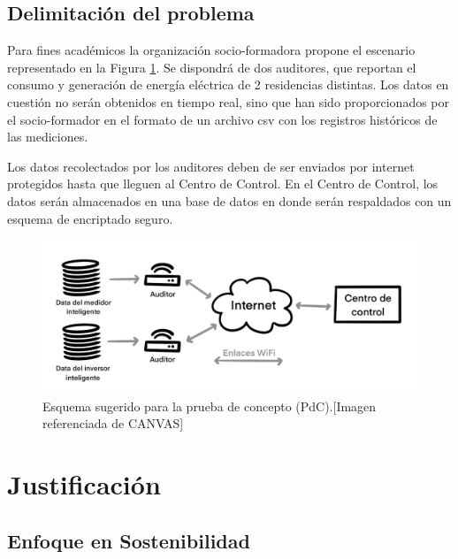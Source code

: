 \documentclass{article}
\begin{document}
        \subsection{Delimitación del problema}

            Para fines académicos la organización socio-formadora propone el escenario representado en la Figura \ref{fig:esquema}. Se dispondrá de dos auditores, que reportan el consumo y generación de energía eléctrica de 2 residencias distintas. Los datos en cuestión no serán obtenidos en tiempo real, sino que han sido proporcionados por el socio-formador en el formato de un archivo csv con los registros históricos de las mediciones.

            Los datos recolectados por los auditores deben de ser enviados por internet protegidos hasta que lleguen al Centro de Control. En el Centro de Control, los datos serán almacenados en una base de datos en donde serán respaldados con un esquema de encriptado seguro.

            \begin{figure}[h]
                \centering
                \includegraphics[scale=0.35]{esquema_reto.png}
                \caption{Esquema sugerido para la prueba de concepto (PdC).[Imagen referenciada de CANVAS]}
                \label{fig:esquema}
            \end{figure}

    \section{Justificación} \label{sec:justification}

        \subsection{Enfoque en Sostenibilidad}
\end{document}
